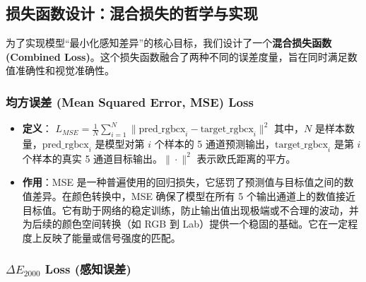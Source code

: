 \subsection[\hspace{-2pt}损失函数设计：混合损失的哲学与实现]{{\heiti{} \hspace{-8pt}损失函数设计：混合损失的哲学与实现}}\label{section2: 损失函数设计}

为了实现模型“最小化感知差异”的核心目标，我们设计了一个\textbf{混合损失函数 (Combined Loss)}。这个损失函数融合了两种不同的误差度量，旨在同时满足数值准确性和视觉准确性。

\subsubsection[\hspace{-2pt}均方误差 (Mean Squared Error, MSE) Loss]{{\heiti{} \hspace{-8pt}均方误差 (Mean Squared Error, MSE) Loss}}\label{section2: MSE Loss}

\begin{itemize}
    \item \textbf{定义}：
    $ L_{MSE} = \frac{1}{N} \sum_{i=1}^N \| \text{pred\_rgbcx}_i - \text{target\_rgbcx}_i \|^2 $
    其中，$N$ 是样本数量，$\text{pred\_rgbcx}_i$ 是模型对第 $i$ 个样本的 5 通道预测输出，$\text{target\_rgbcx}_i$ 是第 $i$ 个样本的真实 5 通道目标输出。$\| \cdot \|^2$ 表示欧氏距离的平方。
    \item \textbf{作用}：MSE 是一种普遍使用的回归损失，它惩罚了预测值与目标值之间的数值差异。在颜色转换中，MSE 确保了模型在所有 5 个输出通道上的数值接近目标值。它有助于网络的稳定训练，防止输出值出现极端或不合理的波动，并为后续的颜色空间转换（如 RGB 到 Lab）提供一个稳固的基础。它在一定程度上反映了能量或信号强度的匹配。
\end{itemize}

\subsubsection[\hspace{-2pt}$\Delta E_{2000}$ Loss (感知误差)]{{\heiti{} \hspace{-8pt}$\Delta E_{2000}$ Loss (感知误差)}}\label{section2: Delta E 2000 Loss}

